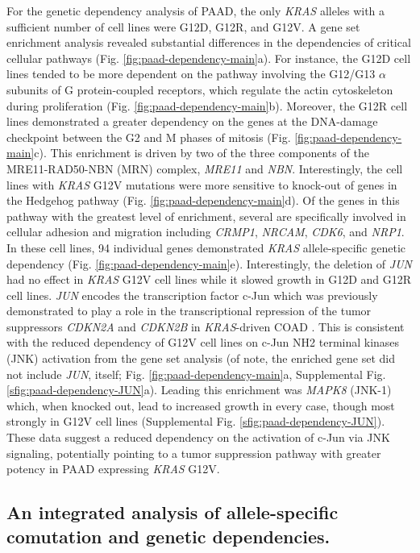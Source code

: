 \documentclass[english, 10pt, letterpaper]{article}
\newcommand{\KRAS}{\emph{KRAS}}
\begin{document}
For the genetic dependency analysis of PAAD, the only \KRAS{} alleles with a sufficient number of cell lines were G12D, G12R, and G12V.
A gene set enrichment analysis revealed substantial differences in the dependencies of critical cellular pathways (Fig. \ref{fig:paad-dependency-main}a).
For instance, the G12D cell lines tended to be more dependent on the pathway involving the G12/G13 $\alpha$ subunits of G protein-coupled receptors, which regulate the actin cytoskeleton during proliferation \cite{Worzfeld2008G12/G13-mediatedDisease., Siehler2009RegulationReceptors., Suzuki2009RegulationPathways.} (Fig. \ref{fig:paad-dependency-main}b).
Moreover, the G12R cell lines demonstrated a greater dependency on the genes at the DNA-damage checkpoint between the G2 and M phases of mitosis (Fig. \ref{fig:paad-dependency-main}c).
This enrichment is driven by two of the three components of the MRE11-RAD50-NBN (MRN) complex, \emph{MRE11} and \emph{NBN}.
Interestingly, the cell lines with \KRAS{} G12V mutations were more sensitive to knock-out of genes in the Hedgehog pathway (Fig. \ref{fig:paad-dependency-main}d).
Of the genes in this pathway with the greatest level of enrichment, several are specifically involved in cellular adhesion and migration including \emph{CRMP1}, \emph{NRCAM}, \emph{CDK6}, and \emph{NRP1}.
In these cell lines, 94 individual genes demonstrated \KRAS{} allele-specific genetic dependency (Fig. \ref{fig:paad-dependency-main}e).
Interestingly, the deletion of \emph{JUN} had no effect in \KRAS{} G12V cell lines while it slowed growth in G12D and G12R cell lines.
\emph{JUN} encodes the transcription factor c-Jun which was previously demonstrated to play a role in the transcriptional repression of the tumor suppressors \emph{CDKN2A} and \emph{CDKN2B} in \KRAS{}-driven COAD \cite{Serra2014APhenotype.}.
This is consistent with the reduced dependency of G12V cell lines on c-Jun NH2 terminal kinases (JNK) activation from the gene set analysis (of note, the enriched gene set did not include \emph{JUN}, itself; Fig. \ref{fig:paad-dependency-main}a, Supplemental Fig. \ref{sfig:paad-dependency-JUN}a).
Leading this enrichment was \emph{MAPK8} (JNK-1) which, when knocked out, lead to increased growth in every case, though most strongly in G12V cell lines (Supplemental Fig. \ref{sfig:paad-dependency-JUN}).
These data suggest a reduced dependency on the activation of c-Jun via JNK signaling, potentially pointing to a tumor suppression pathway with greater potency in PAAD expressing \KRAS{} G12V.


\subsection*{An integrated analysis of allele-specific comutation and genetic dependencies.}
\end{document}
